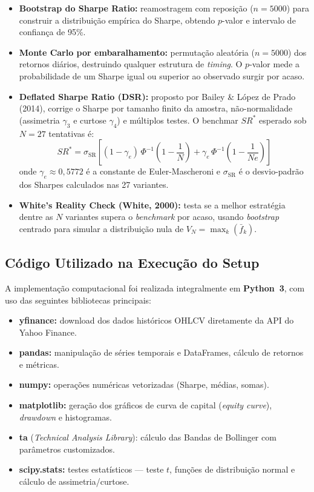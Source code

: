 \documentclass[a4paper,10pt]{article}
\begin{document}
\begin{itemize}
  \item \textbf{Bootstrap do Sharpe Ratio:} reamostragem com reposição ($n = 5000$) para construir a distribuição empírica do Sharpe, obtendo $p$-valor e intervalo de confiança de 95\%.

  \item \textbf{Monte Carlo por embaralhamento:} permutação aleatória ($n = 5000$) dos retornos diários, destruindo qualquer estrutura de \textit{timing}. O $p$-valor mede a probabilidade de um Sharpe igual ou superior ao observado surgir por acaso.

  \item \textbf{Deflated Sharpe Ratio (DSR):} proposto por Bailey \& López de Prado (2014), corrige o Sharpe por tamanho finito da amostra, não-normalidade (assimetria $\gamma_3$ e curtose $\gamma_4$) e múltiplos testes. O benchmar $SR^*$ esperado sob $N = 27$ tentativas é:
  \begin{equation}
    SR^* = \sigma_{\text{SR}} \left[(1-\gamma_e)\,\Phi^{-1}\!\left(1-\frac{1}{N}\right) + \gamma_e\,\Phi^{-1}\!\left(1-\frac{1}{Ne}\right)\right]
  \end{equation}
  onde $\gamma_e \approx 0{,}5772$ é a constante de Euler-Mascheroni e $\sigma_{\text{SR}}$ é o desvio-padrão dos Sharpes calculados nas 27 variantes.

  \item \textbf{White's Reality Check (White, 2000):} testa se a melhor estratégia dentre as $N$ variantes supera o \textit{benchmark} por acaso, usando \textit{bootstrap} centrado para simular a distribuição nula de $V_N = \max_k(\bar{f}_k)$.
\end{itemize}

\subsection{Código Utilizado na Execução do Setup}

A implementação computacional foi realizada integralmente em \textbf{Python~3}, com uso das seguintes bibliotecas principais:

\begin{itemize}
  \item \textbf{yfinance:} download dos dados históricos OHLCV diretamente da API do Yahoo Finance.
  \item \textbf{pandas:} manipulação de séries temporais e DataFrames, cálculo de retornos e métricas.
  \item \textbf{numpy:} operações numéricas vetorizadas (Sharpe, médias, somas).
  \item \textbf{matplotlib:} geração dos gráficos de curva de capital (\textit{equity curve}), \textit{drawdown} e histogramas.
  \item \textbf{ta} (\textit{Technical Analysis Library}): cálculo das Bandas de Bollinger com parâmetros customizados.
  \item \textbf{scipy.stats:} testes estatísticos --- teste $t$, funções de distribuição normal e cálculo de assimetria/curtose.
\end{itemize}
\end{document}
